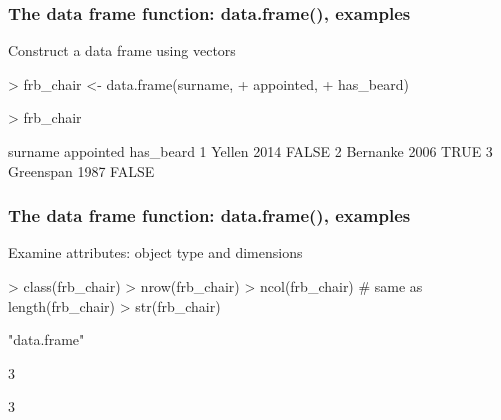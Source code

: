 \documentclass{beamer}
\begin{document}
\begin{frame}[fragile]
\frametitle{The data frame function: data.frame(), examples}

Construct a data frame using vectors

\begin{Schunk}
\begin{Sinput}
> frb_chair <- data.frame(surname,
+                         appointed,
+                         has_beard)
\end{Sinput}
\end{Schunk}
\pause
\begin{Schunk}
\begin{Sinput}
> frb_chair
\end{Sinput}
\begin{Soutput}
    surname appointed has_beard
1    Yellen      2014     FALSE
2  Bernanke      2006      TRUE
3 Greenspan      1987     FALSE
\end{Soutput}
\end{Schunk}

\end{frame}


\begin{frame}[fragile]
\frametitle{The data frame function: data.frame(), examples}

Examine attributes: object type and dimensions
\begin{Schunk}
\begin{Sinput}
> class(frb_chair)
> nrow(frb_chair)
> ncol(frb_chair)  # same as length(frb_chair)
> str(frb_chair)
\end{Sinput}
\end{Schunk}
\pause
\begin{Schunk}
\begin{Soutput}
[1] "data.frame"
\end{Soutput}
\begin{Soutput}
[1] 3
\end{Soutput}
\begin{Soutput}
[1] 3
\end{Soutput}
\end{Schunk}
\end{frame}
\end{document}
